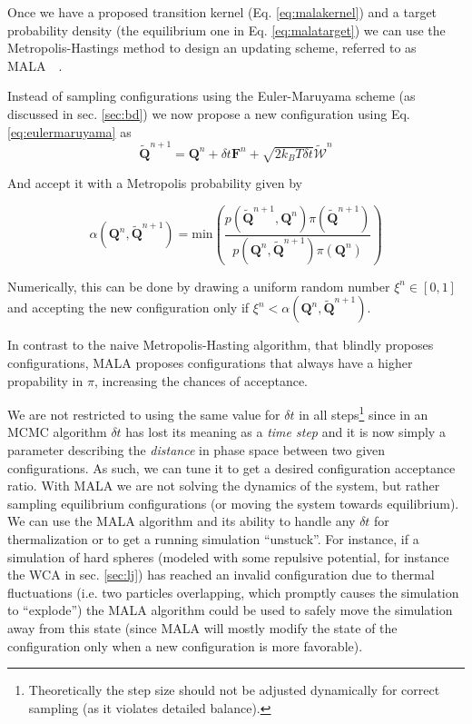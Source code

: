 \documentclass[ twoside,openright,titlepage,numbers=noenddot,%
headinclude,footinclude,cleardoublepage=empty,abstract=on,
BCOR=5mm,paper=b5,fontsize=11pt, dvipsnames
]{scrreprt}
\renewcommand{\vec}[1]{\bm{#1}}
\newcommand{\dt}{\delta t}
\newcommand{\kT}{k_B T}
\begin{document}
Once we have a proposed transition kernel (Eq. \eqref{eq:malakernel}) and a target probability density (the equilibrium one in Eq. \eqref{eq:malatarget}) we can use the Metropolis-Hastings method to design an updating scheme, referred to as MALA~\cite{Roberts1996}~\cite{Besag1994}.

Instead of sampling configurations using the Euler-Maruyama scheme (as discussed in sec. \ref{sec:bd}) we now propose a new configuration using Eq. \eqref{eq:eulermaruyama} as
\begin{equation}
  \widetilde{\vec{Q}}^{n+1} = \vec{Q}^n + \dt\vec{F}^n + \sqrt{2\kT\dt}\vec{\widetilde{\mathcal{W}}}^n
\end{equation}

And accept it with a Metropolis probability given by

\begin{equation}
  \alpha(\vec{Q}^n, \widetilde{\vec{Q}}^{n+1}) = \text{min}\left(\frac{p(\widetilde{\vec{Q}}^{n+1},\vec{Q}^{n})\pi(\widetilde{\vec{Q}}^{n+1})}{p(\vec{Q}^{n}, \widetilde{\vec{Q}}^{n+1})\pi(\vec{Q}^{n})}\right)
\end{equation}

Numerically, this can be done by drawing a uniform random number $\xi^n \in [0,1]$ and accepting the new configuration only if $\xi^n<\alpha(\vec{Q}^n, \widetilde{\vec{Q}}^{n+1})$.

In contrast to the naive Metropolis-Hasting algorithm, that blindly proposes configurations, MALA proposes configurations that always have a higher propability in $\pi$, increasing the chances of acceptance.

We are not restricted to using the same value for $\dt$ in all steps\footnote{Theoretically the step size should not be adjusted dynamically for correct sampling (as it violates detailed balance).} since in an MCMC algorithm $\dt$ has lost its meaning as a \emph{time step} and it is now simply a parameter describing the \emph{distance} in phase space between two given configurations. As such, we can tune it to get a desired configuration acceptance ratio.
With MALA we are not solving the dynamics of the system, but rather sampling equilibrium configurations (or moving the system towards equilibrium). We can use the MALA algorithm and its ability to handle any $\dt$ for thermalization or to get a running simulation ``unstuck''. For instance, if a simulation of hard spheres (modeled with some repulsive potential, for instance the WCA in sec. \ref{sec:lj}) has reached an invalid configuration due to thermal fluctuations (i.e. two particles overlapping, which promptly causes the simulation to ``explode'') the MALA algorithm could be used to safely move the simulation away from this state (since MALA will mostly modify the state of the configuration only when a new configuration is more favorable).
\end{document}
